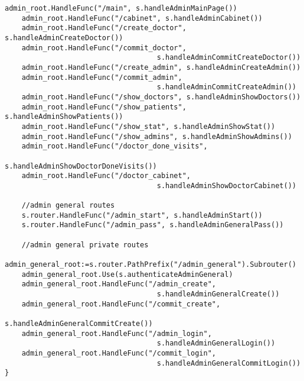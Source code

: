 \begin{appendices}
\begin{lstlisting}[caption={Настройка роутера(продолжение)}]
	admin_root.HandleFunc("/main", s.handleAdminMainPage())
	admin_root.HandleFunc("/cabinet", s.handleAdminCabinet())
	admin_root.HandleFunc("/create_doctor", s.handleAdminCreateDoctor())
	admin_root.HandleFunc("/commit_doctor", 
									s.handleAdminCommitCreateDoctor())
	admin_root.HandleFunc("/create_admin", s.handleAdminCreateAdmin())
	admin_root.HandleFunc("/commit_admin", 
									s.handleAdminCommitCreateAdmin())
	admin_root.HandleFunc("/show_doctors", s.handleAdminShowDoctors())
	admin_root.HandleFunc("/show_patients", s.handleAdminShowPatients())
	admin_root.HandleFunc("/show_stat", s.handleAdminShowStat())
	admin_root.HandleFunc("/show_admins", s.handleAdminShowAdmins())
	admin_root.HandleFunc("/doctor_done_visits", 
									s.handleAdminShowDoctorDoneVisits())
	admin_root.HandleFunc("/doctor_cabinet", 
									s.handleAdminShowDoctorCabinet())
	
	//admin general routes
	s.router.HandleFunc("/admin_start", s.handleAdminStart())
	s.router.HandleFunc("/admin_pass", s.handleAdminGeneralPass())
	
	//admin general private routes
	admin_general_root:=s.router.PathPrefix("/admin_general").Subrouter()
	admin_general_root.Use(s.authenticateAdminGeneral)
	admin_general_root.HandleFunc("/admin_create", 
									s.handleAdminGeneralCreate())
	admin_general_root.HandleFunc("/commit_create", 
									s.handleAdminGeneralCommitCreate())
	admin_general_root.HandleFunc("/admin_login", 
									s.handleAdminGeneralLogin())
	admin_general_root.HandleFunc("/commit_login", 
									s.handleAdminGeneralCommitLogin())
}
\end{lstlisting}


\end{appendices}